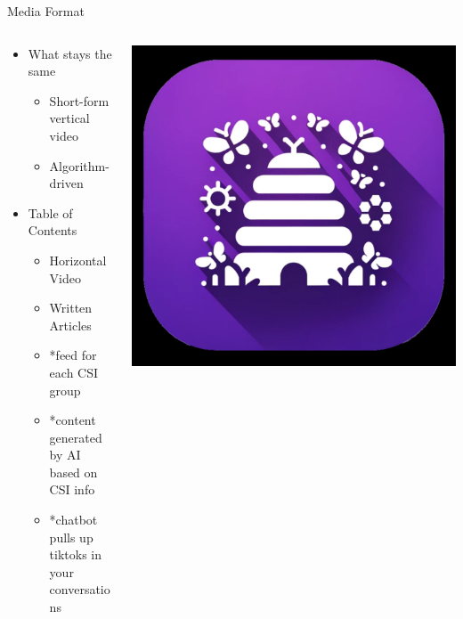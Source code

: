 \documentclass[aspectratio=169]{beamer}
\begin{document}
\begin{frame}{Media Format}
\begin{columns}[T]
    \begin{column}[T]{0.5\textwidth}
        \begin{itemize}
            \item What stays the same
            \begin{itemize}
                \item Short-form vertical video
                \item Algorithm-driven
            \end{itemize}
            \item Table of Contents
            \begin{itemize}
                \item Horizontal Video
                \item Written Articles
                \item *feed for each CSI group
                \item *content generated by AI based on CSI info
                \item *chatbot pulls up tiktoks in your conversations
            \end{itemize}
        \end{itemize}
    \end{column}
    \begin{column}{0.5\textwidth}
        \includegraphics[height=0.8\textheight]{imgs/app_icons/2.png}
    \end{column}
\end{columns}
\end{frame}
\end{document}

